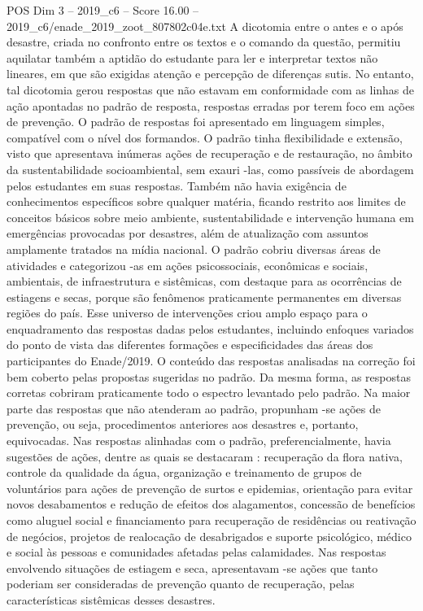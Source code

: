 \begin{textsample}{POS Dim 3 – 2019\_c6 – Score 16.00 – 2019\_c6/enade\_2019\_zoot\_807802c04e.txt}
A dicotomia entre o antes e o após desastre, criada no confronto entre os textos e o comando da questão, permitiu aquilatar também a aptidão do estudante para ler e interpretar textos não lineares, em que são exigidas atenção e percepção de diferenças sutis.
No entanto, tal dicotomia gerou respostas que não estavam em conformidade com as linhas de ação apontadas no padrão de resposta, respostas erradas por terem foco em ações de prevenção.
O padrão de respostas foi apresentado em linguagem simples, compatível com o nível dos formandos.
O padrão tinha flexibilidade e extensão, visto que apresentava inúmeras ações de recuperação e de restauração, no âmbito da sustentabilidade socioambiental, sem exauri -las, como passíveis de abordagem pelos estudantes em suas respostas.
Também não havia exigência de conhecimentos específicos sobre qualquer matéria, ficando restrito aos limites de conceitos básicos sobre meio ambiente, sustentabilidade e intervenção humana em emergências provocadas por desastres, além de atualização com assuntos amplamente tratados na mídia nacional.
O padrão cobriu diversas áreas de atividades e categorizou -as em ações psicossociais, econômicas e sociais, ambientais, de infraestrutura e sistêmicas, com destaque para as ocorrências de estiagens e secas, porque são fenômenos praticamente permanentes em diversas regiões do país.
Esse universo de intervenções criou amplo espaço para o enquadramento das respostas dadas pelos estudantes, incluindo enfoques variados do ponto de vista das diferentes formações e especificidades das áreas dos participantes do Enade/2019.
O conteúdo das respostas analisadas na correção foi bem coberto pelas propostas sugeridas no padrão.
Da mesma forma, as respostas corretas cobriram praticamente todo o espectro levantado pelo padrão.
Na maior parte das respostas que não atenderam ao padrão, propunham -se ações de prevenção, ou seja, procedimentos anteriores aos desastres e, portanto, equivocadas.
Nas respostas alinhadas com o padrão, preferencialmente, havia sugestões de ações, dentre as quais se destacaram : recuperação da flora nativa, controle da qualidade da água, organização e treinamento de grupos de voluntários para ações de prevenção de surtos e epidemias, orientação para evitar novos desabamentos e redução de efeitos dos alagamentos, concessão de benefícios como aluguel social e financiamento para recuperação de residências ou reativação de negócios, projetos de realocação de desabrigados e suporte psicológico, médico e social às pessoas e comunidades afetadas pelas calamidades.
Nas respostas envolvendo situações de estiagem e seca, apresentavam -se ações que tanto poderiam ser consideradas de prevenção quanto de recuperação, pelas características sistêmicas desses desastres.

\end{textsample}
